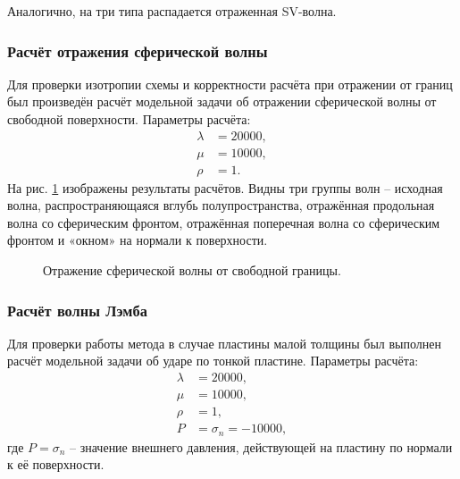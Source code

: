 Аналогично, на три типа распадается отраженная SV-волна. 


\subsubsection{Расчёт отражения сферической волны}
Для проверки изотропии схемы и корректности расчёта при отражении от границ был произведён расчёт модельной задачи об отражении сферической волны от свободной поверхности. Параметры расчёта:
\begin{align}
\lambda&=20000, \nonumber\\
\mu&=10000, \nonumber\\
\rho&=1.
\end{align}
На рис. \ref{pic:sphere_wave_reflection_2d} изображены результаты расчётов. Видны три группы волн -- исходная волна, распространяющаяся вглубь полупространства, отражённая продольная волна со сферическим фронтом, отражённая поперечная волна со сферическим фронтом и «окном» на нормали к поверхности.

\begin{figure}[h]
\caption{Отражение сферической волны от свободной границы.}
\label{pic:sphere_wave_reflection_2d}
\end{figure}

\clearpage
\newpage

\subsubsection{Расчёт волны Лэмба}

Для проверки работы метода в случае пластины малой толщины был выполнен расчёт модельной задачи об ударе по тонкой пластине. Параметры расчёта:
\begin{align}
\lambda&=20000, \nonumber\\
\mu&=10000, \nonumber\\
\rho&=1, \nonumber\\
P &= \sigma_n = -10000,
\end{align}
где $P = \sigma_n$ -- значение внешнего давления, действующей на пластину по нормали к её поверхности.

